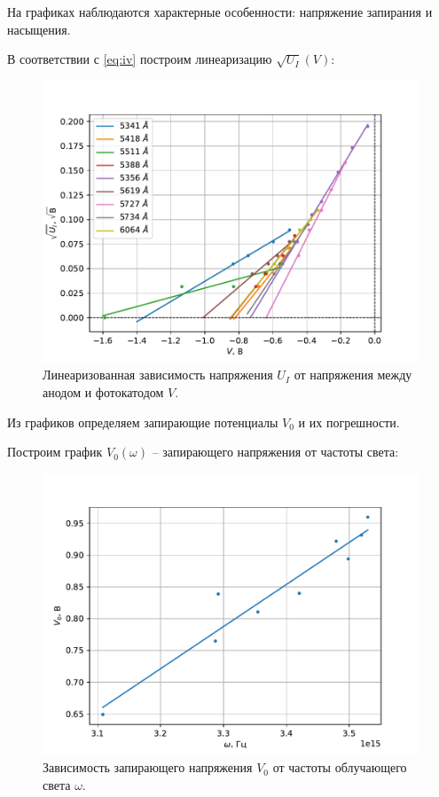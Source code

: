 \documentclass[a4paper, 12pt]{article} %
\begin{document}
	На графиках наблюдаются характерные особенности: напряжение запирания и насыщения.
	
	В соответствии с \eqref{eq:iv} построим линеаризацию $\sqrt{U_I}(V)$:
	
	\begin{figure}[h!]
		\centering
		\includegraphics[width=0.8\linewidth]{gen/iv.pdf}
		\caption{\centering
				 Линеаризованная зависимость напряжения $U_I$ от напряжения между анодом и фотокатодом $V$.}
		\label{fig:iv}
	\end{figure}
	
	Из графиков определяем запирающие потенциалы $V_0$ и их погрешности.

	Построим график $V_0(\omega)$ -- запирающего напряжения от частоты света:
	
	\begin{figure}[h!]
		\centering
		\includegraphics[width=0.8\linewidth]{gen/v0_omega.pdf}
		\caption{\centering
			Зависимость запирающего напряжения $V_0$ от частоты облучающего света $\omega$.}
		\label{fig:v0_omega}
	\end{figure}
	
\end{document}
